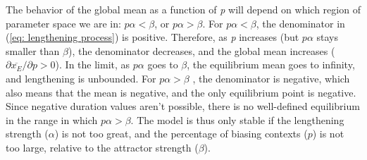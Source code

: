 The behavior of the global mean as a function of \emph{p} will depend
on which region of parameter space we are in: $p\alpha<\beta$, or
$p\alpha>\beta$. For $p\alpha<\beta$, the denominator in (\ref{eq: lengthening process})
is positive. Therefore, as \emph{p} increases (but $p\alpha$ stays
smaller than $\beta$), the denominator decreases, and the global
mean increases (${\partial\overline{x_{E}}}/{\partial p}>0$).
In the limit, as $p\alpha$ goes to $\beta$, the equilibrium mean
goes to infinity, and lengthening is unbounded. For $p\alpha>\beta$
, the denominator is negative, which also means that the mean is negative,
and the only equilibrium point is negative. Since negative duration
values aren't possible, there is no well-defined equilibrium in the
range in which $p\alpha>\beta$. The  model is thus
only stable if the lengthening strength ($\alpha$) is not too great,
and the percentage of biasing contexts ($p$) is not too large, relative
to the attractor strength ($\beta$).

